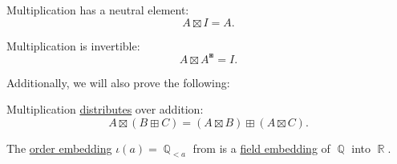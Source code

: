 \begin{proposition}
\begin{thmenum}[resume=thm:field_of_real_numbers]
     Multiplication has a neutral element:
    \begin{equation}\label{eq:thm:field_of_real_numbers/multiplication_neutral}
      A \boxtimes I = A.
    \end{equation}

     Multiplication is invertible:
    \begin{equation}\label{eq:thm:field_of_real_numbers/multiplication_invertible}
      A \boxtimes A^\boxast = I.
    \end{equation}
  \end{thmenum}

  Additionally, we will also prove the following:
  \begin{thmenum}[resume=thm:field_of_real_numbers]
     Multiplication \hyperref[def:semiring]{distributes} over addition:
    \begin{equation}\label{eq:thm:field_of_real_numbers/distributivity}
      A \boxtimes (B \boxplus C) = (A \boxtimes B) \boxplus (A \boxtimes C).
    \end{equation}

     The \hyperref[def:preordered_set/homomorphism]{order embedding} \( \iota(a) = \BbbQ_{<a} \) from  is a \hyperref[def:field/homomorphism]{field embedding} of \( \BbbQ \) into \( \BbbR \).
  \end{thmenum}
\end{proposition}
